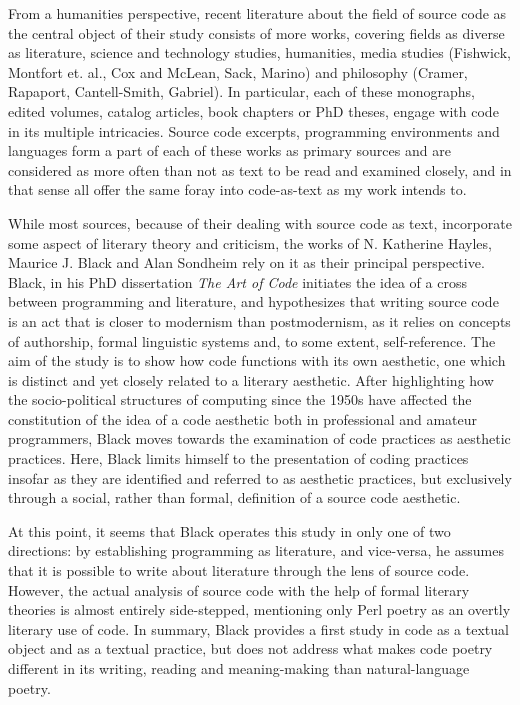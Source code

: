 \vspace*{1\baselineskip}

From a humanities perspective, recent literature about the field of source code as the central object of their study consists of more works, covering fields as diverse as literature, science and technology studies, humanities, media studies (Fishwick, Montfort et. al., Cox and McLean, Sack, Marino) and philosophy (Cramer, Rapaport, Cantell-Smith, Gabriel). In particular, each of these monographs, edited volumes, catalog articles, book chapters or PhD theses, engage with code in its multiple intricacies. Source code excerpts, programming environments and languages form a part of each of these works as primary sources and are considered as more often than not as text to be read and examined closely, and in that sense all offer the same foray into code-as-text as my work intends to.

While most sources, because of their dealing with source code as text, incorporate some aspect of literary theory and criticism, the works of N. Katherine Hayles, Maurice J. Black and Alan Sondheim rely on it as their principal perspective. Black, in his PhD dissertation \emph{The Art of Code}\cite{black_art_2002} initiates the idea of a cross between programming and literature, and hypothesizes that writing source code is an act that is closer to modernism than postmodernism, as it relies on concepts of authorship, formal linguistic systems and, to some extent, self-reference. The aim of the study is to show how code functions with its own aesthetic, one which is distinct and yet closely related to a literary aesthetic. After highlighting how the socio-political structures of computing since the 1950s have affected the constitution of the idea of a code aesthetic both in professional and amateur programmers, Black moves towards the examination of code practices as aesthetic practices. Here, Black limits himself to the presentation of coding practices insofar as they are identified and referred to as aesthetic practices, but exclusively through a social, rather than formal, definition of a source code aesthetic.

At this point, it seems that Black operates this study in only one of two directions: by establishing programming as literature, and vice-versa, he assumes that it is possible to write about literature through the lens of source code. However, the actual analysis of source code with the help of formal literary theories is almost entirely side-stepped, mentioning only Perl poetry as an overtly literary use of code. In summary, Black provides a first study in code as a textual object and as a textual practice, but does not address what makes code poetry different in its writing, reading and meaning-making than natural-language poetry.

